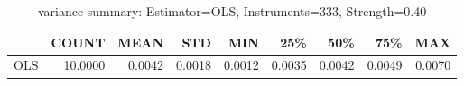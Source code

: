 \begin{table}[ht]
\centering
\caption{variance summary: Estimator=OLS, Instruments=333, Strength=0.40}
\begin{tabular}{lrrrrrrrr}
\toprule
 & COUNT & MEAN & STD & MIN & 25\% & 50\% & 75\% & MAX \\
\midrule
OLS & 10.0000 & 0.0042 & 0.0018 & 0.0012 & 0.0035 & 0.0042 & 0.0049 & 0.0070 \\
\bottomrule
\end{tabular}
\end{table}
